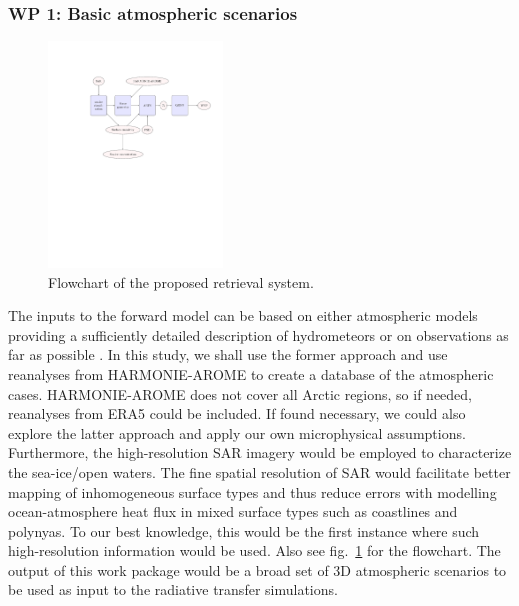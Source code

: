 \documentclass[12pt,oneside,a4paper]{article}
\begin{document}
\subsubsection*{WP 1: Basic atmospheric scenarios}
%
\begin{figure}[t]
	\centering
	\includegraphics[trim=140 370 40 125,clip,height = 60mm]{flowchart.pdf} 
	\caption{Flowchart of the proposed retrieval system.}
	\label{fig:flowchart}
\end{figure}
\label{sec:atmscenes}
The inputs to the forward model can be based on either atmospheric models providing a sufficiently detailed description of hydrometeors or on observations as far as possible \citep{ekelund:using:20}. In this study, we shall use the former approach and use reanalyses from HARMONIE-AROME to create a database of the atmospheric cases. HARMONIE-AROME does not cover all Arctic regions, so if needed, reanalyses from ERA5 could be included. If found necessary, we could also explore the latter approach and apply our own microphysical assumptions. Furthermore, the high-resolution SAR imagery would be employed to characterize the sea-ice/open waters. The fine spatial resolution of SAR would facilitate better mapping of inhomogeneous surface types and thus reduce errors with modelling ocean-atmosphere heat flux in mixed surface types such as coastlines and polynyas. To our best knowledge, this would be the first instance where such high-resolution information would be used. Also see fig.~\ref{fig:flowchart} for the flowchart.
The output of this work package would be a broad set of 3D atmospheric scenarios to be used as input to the radiative transfer simulations.
\end{document}
